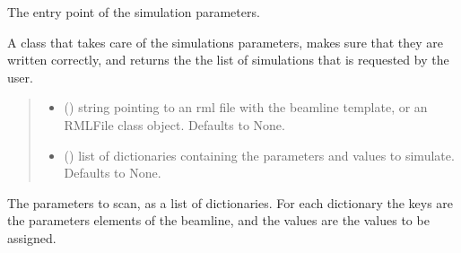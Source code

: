 \documentclass[letterpaper,10pt,english]{sphinxmanual}
\begin{document}
\begin{fulllineitems}
\label{\detokenize{API:raypyng.simulate.SimulationParams}}
\pysigstartsignatures
{}
\pysigstopsignatures
\sphinxAtStartPar
The entry point of the simulation parameters.

\sphinxAtStartPar
A class that takes care of the simulations parameters,
makes sure that they are written correctly,
and returns the the list of simulations that is requested by the user.
\begin{quote}\begin{description}
\begin{itemize}
\item {} 
\sphinxAtStartPar
{} (\sphinxstyleliteralemphasis{\sphinxupquote{, }}) \textendash{} string pointing to an rml
file with the beamline template,
or an RMLFile class object.
Defaults to None.

\item {} 
\sphinxAtStartPar
{} (\sphinxstyleliteralemphasis{\sphinxupquote{, }}) \textendash{} list of dictionaries containing the
parameters and values to simulate.
Defaults to None.

\end{itemize}

\end{description}\end{quote}

\begin{fulllineitems}
\label{\detokenize{API:raypyng.simulate.SimulationParams.params}}
\pysigstartsignatures
{}
\pysigstopsignatures
\sphinxAtStartPar
The parameters to scan, as a list of dictionaries.
For each dictionary the keys are the parameters elements of the beamline, and the values are the
values to be assigned.


\end{fulllineitems}
\end{fulllineitems}
\end{document}
